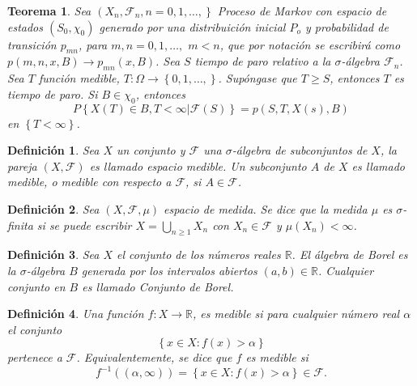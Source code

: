 \documentclass{article}
\newtheorem{Def}{Definición}
\newtheorem{Teo}{Teorema}
\newcommand{\rea}{\mathbb{R}}
\begin{document}
\begin{Teo}
Sea $\left(X_{n},\mathcal{F}_{n},n=0,1,\ldots,\right\}$ Proceso de
Markov con espacio de estados $\left(S_{0},\chi_{0}\right)$
generado por una distribuici\'on inicial $P_{o}$ y probabilidad de
transici\'on $p_{mn}$, para $m,n=0,1,\ldots,$ $m<n$, que por
notaci\'on se escribir\'a como $p\left(m,n,x,B\right)\rightarrow
p_{mn}\left(x,B\right)$. Sea $S$ tiempo de paro relativo a la
$\sigma$-\'algebra $\mathcal{F}_{n}$. Sea $T$ funci\'on medible,
$T:\Omega\rightarrow\left\{0,1,\ldots,\right\}$. Sup\'ongase que
$T\geq S$, entonces $T$ es tiempo de paro. Si $B\in\chi_{0}$,
entonces
\begin{equation}\label{Prop.Fuerte.Markov}
P\left\{X\left(T\right)\in
B,T<\infty|\mathcal{F}\left(S\right)\right\} =
p\left(S,T,X\left(s\right),B\right)
\end{equation}
en $\left\{T<\infty\right\}$.
\end{Teo}


\begin{Def}
Sea $X$ un conjunto y $\mathcal{F}$ una $\sigma$-\'algebra de
subconjuntos de $X$, la pareja $\left(X,\mathcal{F}\right)$ es
llamado espacio medible. Un subconjunto $A$ de $X$ es llamado
medible, o medible con respecto a $\mathcal{F}$, si
$A\in\mathcal{F}$.
\end{Def}

\begin{Def}
Sea $\left(X,\mathcal{F},\mu\right)$ espacio de medida. Se dice
que la medida $\mu$ es $\sigma$-finita si se puede escribir
$X=\bigcup_{n\geq1}X_{n}$ con $X_{n}\in\mathcal{F}$ y
$\mu\left(X_{n}\right)<\infty$.
\end{Def}

\begin{Def}\label{Cto.Borel}
Sea $X$ el conjunto de los n\'umeros reales $\rea$. El \'algebra
de Borel es la $\sigma$-\'algebra $B$ generada por los intervalos
abiertos $\left(a,b\right)\in\rea$. Cualquier conjunto en $B$ es
llamado {\em Conjunto de Borel}.
\end{Def}

\begin{Def}\label{Funcion.Medible}
Una funci\'on $f:X\rightarrow\rea$, es medible si para cualquier
n\'umero real $\alpha$ el conjunto
\[\left\{x\in X:f\left(x\right)>\alpha\right\}\]
pertenece a $\mathcal{F}$. Equivalentemente, se dice que $f$ es
medible si
\[f^{-1}\left(\left(\alpha,\infty\right)\right)=\left\{x\in X:f\left(x\right)>\alpha\right\}\in\mathcal{F}.\]
\end{Def}
\end{document}
